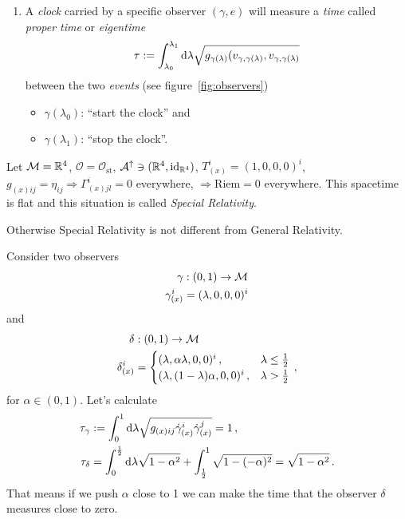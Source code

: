 \begin{enumerate}[resume, label=(\subscript{P}{{\arabic*}})]
    \item A \textit{clock} carried by a specific observer $(\gamma, e)$ will measure a
        \textit{time} called \textit{proper time} or \textit{eigentime}
        \begin{equation}
            \tau := \int_{\lambda_0}^{\lambda_1} \operatorname{d\!} \lambda \sqrt{g_{\gamma(\lambda)}(v_{\gamma, \gamma(\lambda)}, v_{\gamma, \gamma(\lambda)}}
            \end{equation}
            between the two \textit{events} (see figure~\ref{fig:observers})
            \begin{itemize}
                \item $\gamma(\lambda_0)$: ``start the clock'' and
                \item $\gamma(\lambda_1)$: ``stop the clock''.
            \end{itemize}
            \label{item:clock}
\end{enumerate}
\begin{example}
Let $\mathcal{M} = \mathbb{R}^4$, $\mathcal{O} = \mathcal{O}_\text{st}$, 
$\mathcal{A}^\uparrow \ni (\mathbb{R}^4, \mathrm{id}_{\mathbb{R}^4})$, $T^i_{(x)} = (1,0,0,0)^i$,
$g_{(x)ij} = \eta_{ij} \Rightarrow \Gamma^i_{(x)jl}=0$ everywhere,
$\Rightarrow \mathrm{Riem}=0$ everywhere.
This spacetime is flat and this situation is called \textit{Special Relativity}.
\begin{note}
    Otherwise Special Relativity is not different from General Relativity.
\end{note}
Consider two observers
\begin{align}
    \gamma&: (0,1)\to \mathcal{M}\\
    \gamma_{(x)}^i &= (\lambda, 0,0,0)^i
\end{align}
and
\begin{align}
    \delta&:(0,1)\to\mathcal{M}\\
    \delta_{(x)}^i &=
    \begin{cases}
        (\lambda, \alpha \lambda, 0,0)^i\,,& \lambda \leq \frac{1}{2}\\
        (\lambda, (1-\lambda) \alpha , 0,0)^i\,,& \lambda > \frac{1}{2}\\
    \end{cases}\,,
\end{align}
for $\alpha\in(0,1)$.
Let's calculate
\begin{align}
    \tau_\gamma &:= \int_0^1 \operatorname{d\!} \lambda \sqrt{g_{(x)ij}\dot{\gamma}^i_{(x)}\dot{\gamma}^j_{(x)}} = 1\,,\\
    \tau_\delta &= \int_0^{\frac{1}{2}}\operatorname{d\!} \lambda \sqrt{1 - \alpha^2} + \int_{\frac{1}{2}}^1 \sqrt{1 - (-\alpha)^2}
    = \sqrt{1 - \alpha^2}\,.
\end{align}
That means if we push $\alpha$ close to 1 we can make the time that the observer
$\delta$ measures close to zero.
\end{example}


